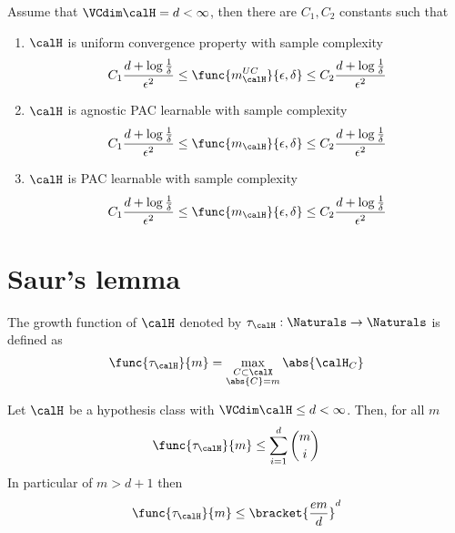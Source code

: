 \begin{corollary}
    Assume that \(\VCdim \calH = d < \infty\), then there are \(C_1, C_2\) constants such that 
    \begin{enumerate}
        \item \(\calH\) is uniform convergence property with sample complexity
        \begin{equation*}
            C_1 \dfrac{d + \log \frac{1}{\delta}}{\epsilon ^2} \leq \func{m_{\calH}^{UC}}{\epsilon, \delta} \leq C_2 \dfrac{d + \log \frac{1}{\delta}}{\epsilon ^2}
        \end{equation*}
        \item \(\calH\) is agnostic PAC learnable with sample complexity
        \begin{equation*}
            C_1 \dfrac{d + \log \frac{1}{\delta}}{\epsilon ^2} \leq \func{m_{\calH}}{\epsilon, \delta} \leq C_2 \dfrac{d + \log \frac{1}{\delta}}{\epsilon ^2}
        \end{equation*}
        \item \(\calH\) is PAC learnable with sample complexity
        \begin{equation*}
            C_1 \dfrac{d + \log \frac{1}{\delta}}{\epsilon ^2} \leq \func{m_{\calH}}{\epsilon, \delta} \leq C_2 \dfrac{d + \log \frac{1}{\delta}}{\epsilon ^2}
        \end{equation*}
    \end{enumerate}
\end{corollary}

\section{Saur's lemma}
\begin{definition}
    The growth function of \(\calH\) denoted by \(\tau_{\calH} : \Naturals \to \Naturals\) is defined as 
    \begin{equation*}
        \func{\tau_{\calH}}{m} = \max_{\substack{C \subset \calX \\ \abs{C} = m}} \abs{\calH_C}
    \end{equation*} 
\end{definition}

\begin{lemma} 
    Let \(\calH\) be a hypothesis class with \(\VCdim \calH \leq d < \infty\). Then, for all \(m\)
    \begin{equation*}
        \func{\tau_{\calH}}{m} \leq \sum_{i = 1}^d \binom{m}{i}
    \end{equation*}
    In particular of \(m > d + 1\) then 
    \begin{equation*}
        \func{\tau_{\calH}}{m} \leq \bracket{\dfrac{em}{d}}^d
    \end{equation*}
\end{lemma}

